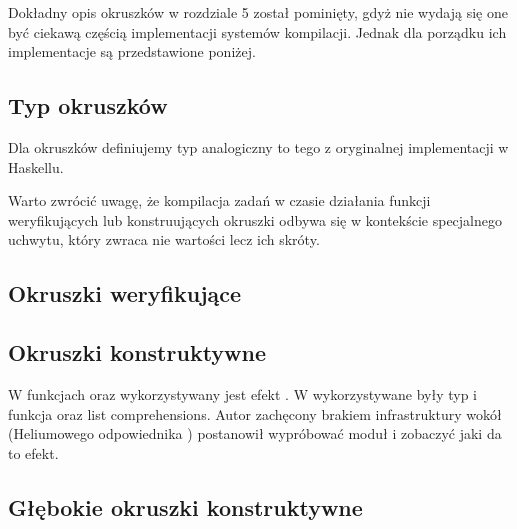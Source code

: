 Dokładny opis okruszków w rozdziale 5 został pominięty, gdyż nie wydają się one być ciekawą częścią implementacji systemów kompilacji. Jednak dla porządku ich implementacje są przedstawione poniżej. 

\subsection{Typ okruszków}

Dla okruszków definiujemy typ analogiczny to tego z oryginalnej implementacji w Haskellu.

\begin{minipage}{\textwidth}
  
\end{minipage}

Warto zwrócić uwagę, że kompilacja zadań w czasie działania funkcji weryfikujących lub konstruujących okruszki odbywa się w kontekście specjalnego uchwytu, który zwraca nie wartości lecz ich skróty.

\subsection{Okruszki weryfikujące}

\begin{minipage}{\textwidth}
  
\end{minipage}

\subsection{Okruszki konstruktywne}

\begin{minipage}{\textwidth}
  
\end{minipage}

W funkcjach  oraz  wykorzystywany jest efekt . W \BSaLC{} wykorzystywane były typ  i funkcja  oraz list comprehensions. Autor zachęcony brakiem infrastruktury wokół  (Heliumowego odpowiednika ) postanowił wypróbować moduł  i zobaczyć jaki da to efekt.

\subsection{Głębokie okruszki konstruktywne}

\begin{minipage}{\textwidth}
  
\end{minipage}
